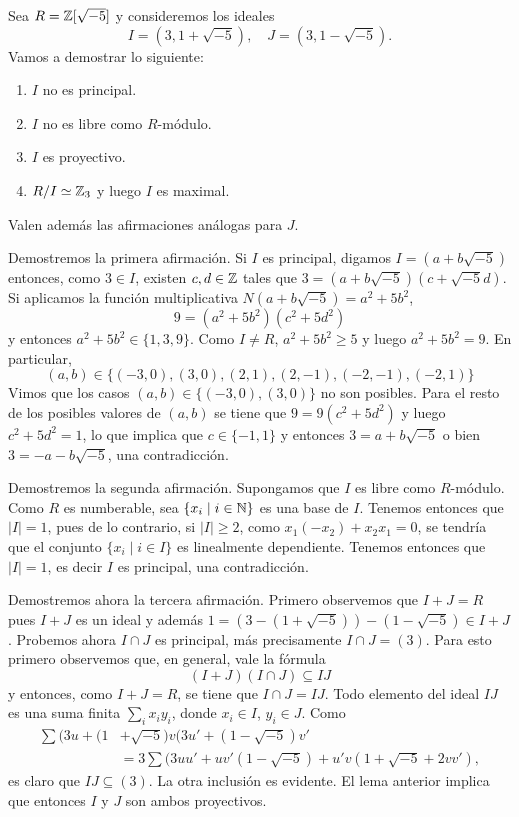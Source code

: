 \begin{example}
	Sea $R=\mathbb{Z}[\sqrt{-5}]$ y consideremos los ideales 
	\[
		I=(3,1+\sqrt{-5}),\quad 
		J=(3,1-\sqrt{-5}).
	\]
	Vamos a demostrar lo siguiente:
	\begin{enumerate}
		\item $I$ no es principal.
		\item $I$ no es libre como $R$-módulo.
		\item $I$ es proyectivo.
		\item $R/I\simeq\mathbb{Z}_3$ y luego $I$ es maximal.
	\end{enumerate}
	Valen además las afirmaciones análogas para $J$.

	Demostremos la primera afirmación. Si $I$ es principal, digamos $I=(a+b\sqrt{-5})$ entonces,
	como $3\in I$, existen $c,d\in\mathbb{Z}$ tales que
	$3=(a+b\sqrt{-5})(c+\sqrt{-5}d)$.  Si aplicamos la función multiplicativa 
	$N(a+b\sqrt{-5})=a^2+5b^2$,
	\[
	9=(a^2+5b^2)(c^2+5d^2)
	\]
	y entonces $a^2+5b^2\in\{1,3,9\}$. Como $I\ne R$,  
	$a^2+5b^2\geq5$ y luego $a^2+5b^2=9$. En particular,
	\[
	(a,b)\in\{(-3,0),(3,0),(2,1),(2,-1),(-2,-1),(-2,1)\}
	\]
	Vimos que los casos $(a,b)\in\{(-3,0),(3,0)\}$ no son posibles. Para el resto de los posibles valores de $(a,b)$ 
	se tiene que 
	$9=9(c^2+5d^2)$ y luego $c^2+5d^2=1$, lo que implica que $c\in\{-1,1\}$ y entonces 
	$3=a+b\sqrt{-5}$ o bien $3=-a-b\sqrt{-5}$, una contradicción. 

	Demostremos la segunda afirmación. Supongamos que $I$ es libre como $R$-módulo. Como 
	$R$ es numberable, sea $\{x_i\mid i\in\mathbb{N}\}$ es una base de $I$. Tenemos entonces
	que $|I|=1$, pues de lo contrario, si $|I|\geq2$, como $x_1(-x_2)+x_2x_1=0$, se
	tendría que el conjunto $\{x_i\mid i\in I\}$ es linealmente
	dependiente. Tenemos entonces que $|I|=1$, es decir $I$ es principal, una contradicción. 
	
	Demostremos ahora la tercera afirmación. Primero observemos que $I+J=R$ pues $I+J$ es un ideal
	y además $1 = (3-(1+\sqrt{-5})) - (1-\sqrt{-5})\in I+J$. Probemos ahora $I\cap J$ es
	principal, más precisamente $I\cap J=(3)$. Para esto primero observemos que,
	en general, vale la fórmula
	\[
		(I+J)(I\cap J)\subseteq IJ
	\]
	y entonces, como $I+J=R$, se tiene que $I\cap J=IJ$. Todo elemento del ideal $IJ$ 
	es una suma finita $\sum_i x_iy_i$, donde $x_i\in I$, $y_i\in J$. Como
	\begin{align*}
		\sum (3u+(1&+\sqrt{-5})v(3u'+(1-\sqrt{-5})v'\\
		&=3\sum (3uu'+uv'(1-\sqrt{-5})+u'v(1+\sqrt{-5}+2vv'),
	\end{align*}
	es claro que $IJ\subseteq (3)$. La otra inclusión es evidente. El lema
	anterior implica que entonces $I$ y $J$ son ambos proyectivos.


\end{example}
